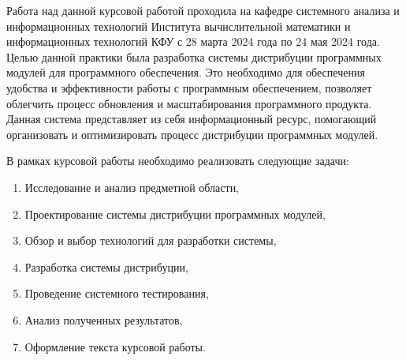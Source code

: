 \Introduction

Работа над данной курсовой работой проходила на кафедре системного анализа и информационных технологий Института вычислительной математики и информационных технологий КФУ с 28 марта 2024 года по 24 мая 2024 года.
Целью данной практики была разработка системы дистрибуции программных модулей для программного обеспечения. Это необходимо для обеспечения удобства и эффективности работы с программным обеспечением, позволяет облегчить процесс обновления и масштабирования программного продукта. Данная система представляет из себя информационный ресурс, помогающий организовать и оптимизировать процесс дистрибуции программных модулей.

В рамках курсовой работы необходимо реализовать следующие задачи:

\begin{enumerate}
\item Исследование и анализ предметной области,
\item Проектирование системы дистрибуции программных модулей,
\item Обзор и выбор технологий для разработки системы,
\item Разработка системы дистрибуции,
\item Проведение системного тестирования,
\item Анализ полученных результатов,
\item Оформление текста курсовой работы.
\end{enumerate}
